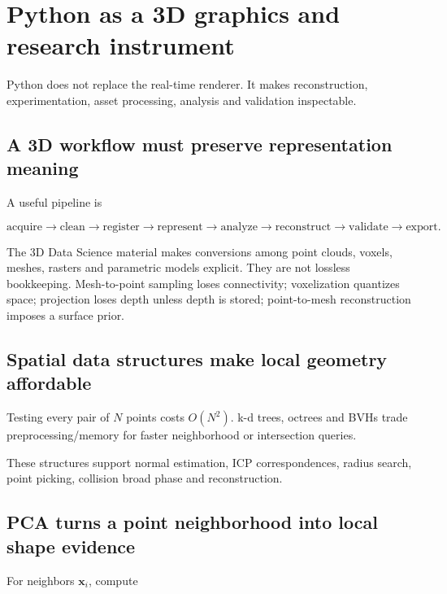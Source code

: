 \section{Python as a 3D graphics and research instrument}\label{python-as-a-3d-graphics-and-research-instrument}

Python does not replace the real-time renderer. It makes reconstruction, experimentation, asset processing, analysis and validation inspectable.

\subsection{A 3D workflow must preserve representation meaning}\label{a-3d-workflow-must-preserve-representation-meaning}

A useful pipeline is

\[
\text{acquire}\rightarrow\text{clean}\rightarrow\text{register}\rightarrow
\text{represent}\rightarrow\text{analyze}\rightarrow
\text{reconstruct}\rightarrow\text{validate}\rightarrow\text{export}.
\]

The 3D Data Science material makes conversions among point clouds, voxels, meshes, rasters and parametric models explicit. They are not lossless bookkeeping. Mesh-to-point sampling loses connectivity; voxelization quantizes space; projection loses depth unless depth is stored; point-to-mesh reconstruction imposes a surface prior.

\subsection{Spatial data structures make local geometry affordable}\label{spatial-data-structures-make-local-geometry-affordable}

Testing every pair of \(N\) points costs \(O(N^2)\). k-d trees, octrees and BVHs trade preprocessing/memory for faster neighborhood or intersection queries.

These structures support normal estimation, ICP correspondences, radius search, point picking, collision broad phase and reconstruction.

\subsection{PCA turns a point neighborhood into local shape evidence}\label{pca-turns-a-point-neighborhood-into-local-shape-evidence}

For neighbors \(\mathbf x_i\), compute

